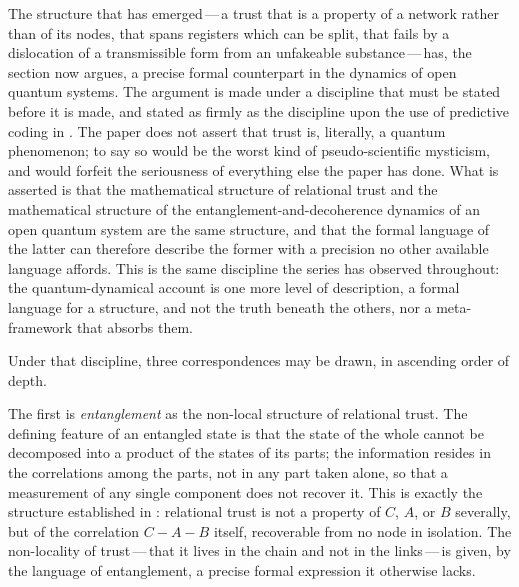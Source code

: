 The structure that has emerged\,---\,a trust that is a property of a network rather than of its nodes, that spans registers which can be split, that fails by a dislocation of a transmissible form from an unfakeable substance\,---\,has, the section now argues, a precise formal counterpart in the dynamics of open quantum systems. The argument is made under a discipline that must be stated before it is made, and stated as firmly as the discipline upon the use of predictive coding in .  The paper does not assert that trust is, literally, a quantum phenomenon; to say so would be the worst kind of pseudo-scientific mysticism, and would forfeit the seriousness of everything else the paper has done. What is asserted is that the mathematical structure of relational trust and the mathematical structure of the entanglement-and-decoherence dynamics of an open quantum system are the same structure, and that the formal language of the latter can therefore describe the former with a precision no other available language affords. This is the same discipline the series has observed throughout: the quantum-dynamical account is one more level of description, a formal language for a structure, and not the truth beneath the others, nor a meta-framework that absorbs them.

Under that discipline, three correspondences may be drawn, in ascending order of depth.

The first is \emph{entanglement} as the non-local structure of relational trust. The defining feature of an entangled state is that the state of the whole cannot be decomposed into a product of the states of its parts; the information resides in the correlations among the parts, not in any part taken alone, so that a measurement of any single component does not recover it. This is exactly the structure established in : relational trust is not a property of $C$, $A$, or $B$ severally, but of the correlation $C\!-\!A\!-\!B$ itself, recoverable from no node in isolation. The non-locality of trust\,---\,that it lives in the chain and not in the links\,---\,is given, by the language of entanglement, a precise formal expression it otherwise lacks.

